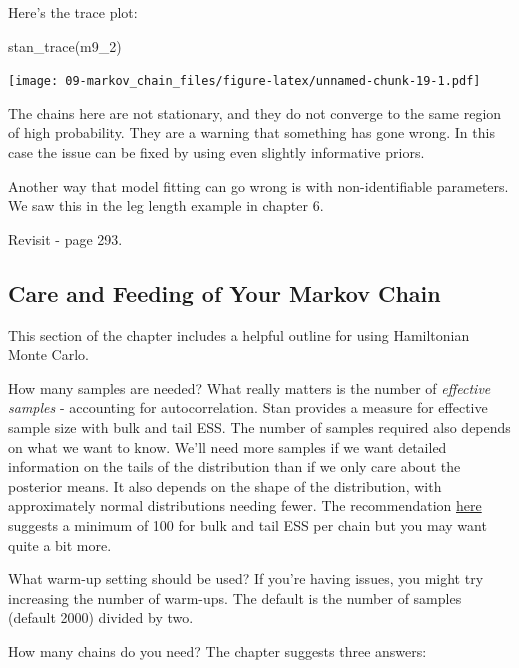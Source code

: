 \documentclass[
]{book}
\newenvironment{Shaded}{\begin{snugshade}}{\end{snugshade}}
\newcommand{\FunctionTok}[1]{\textcolor[rgb]{0.00,0.00,0.00}{#1}}
\newcommand{\NormalTok}[1]{#1}
\begin{document}
Here's the trace plot:

\begin{Shaded}
\begin{Highlighting}[]
\FunctionTok{stan\_trace}\NormalTok{(m9\_2)}
\end{Highlighting}
\end{Shaded}

\texttt{[image: 09-markov\_chain\_files/figure-latex/unnamed-chunk-19-1.pdf]}

The chains here are not stationary, and they do not converge to the same region of high probability. They are a warning that something has gone wrong. In this case the issue can be fixed by using even slightly informative priors.

Another way that model fitting can go wrong is with non-identifiable parameters. We saw this in the leg length example in chapter 6.

Revisit - page 293.

\hypertarget{care-and-feeding-of-your-markov-chain}{%
\subsection*{Care and Feeding of Your Markov Chain}\label{care-and-feeding-of-your-markov-chain}}

This section of the chapter includes a helpful outline for using Hamiltonian Monte Carlo.

How many samples are needed? What really matters is the number of \emph{effective samples} - accounting for autocorrelation. Stan provides a measure for effective sample size with bulk and tail ESS. The number of samples required also depends on what we want to know. We'll need more samples if we want detailed information on the tails of the distribution than if we only care about the posterior means. It also depends on the shape of the distribution, with approximately normal distributions needing fewer. The recommendation \href{https://mc-stan.org/rstan/reference/Rhat.html}{here} suggests a minimum of 100 for bulk and tail ESS per chain but you may want quite a bit more.

What warm-up setting should be used? If you're having issues, you might try increasing the number of warm-ups. The default is the number of samples (default 2000) divided by two.

How many chains do you need? The chapter suggests three answers:
\end{document}
